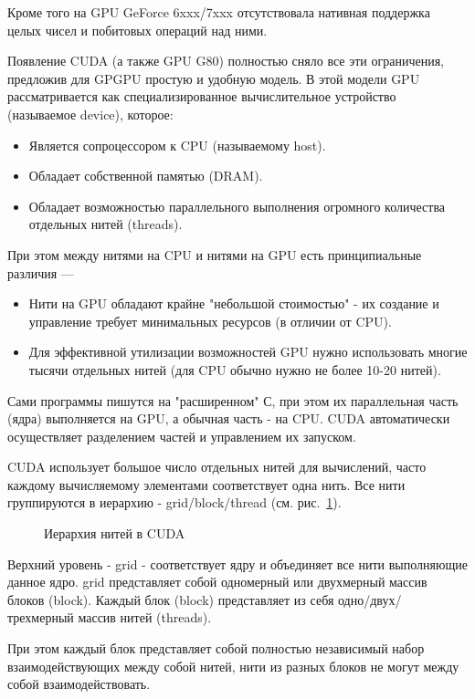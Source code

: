 Кроме того на GPU GeForce 6xxx/7xxx отсутствовала нативная поддержка целых чисел и побитовых операций над ними.

Появление CUDA (а также GPU G80) полностью сняло все эти ограничения, предложив для GPGPU простую и удобную модель. В этой модели GPU рассматривается как специализированное вычислительное устройство (называемое device), которое:
\begin{itemize}
\item Является сопроцессором к CPU (называемому host).
\item Обладает собственной памятью (DRAM).
\item Обладает возможностью параллельного выполнения огромного количества отдельных нитей (threads).
\end{itemize}

При этом между нитями на CPU и нитями на GPU есть принципиальные различия ---
\begin{itemize}
\item Нити на GPU обладают крайне "небольшой стоимостью" - их создание и управление требует минимальных ресурсов (в отличии от CPU).
\item Для эффективной утилизации возможностей GPU нужно использовать многие тысячи отдельных нитей (для CPU обычно нужно не более 10-20 нитей).
\end{itemize}

Сами программы пишутся на "расширенном" С, при этом их параллельная часть (ядра) выполняется на GPU, а обычная часть - на CPU. CUDA автоматически осуществляет разделением частей и управлением их запуском.

CUDA использует большое число отдельных нитей для вычислений, часто каждому вычисляемому элементами соответствует одна нить. Все нити группируются в иерархию - grid/block/thread (см. рис.~\ref{cuda-1}).
\begin{figure}[h]
\caption{\small{Иерархия нитей в CUDA}}
\label{cuda-1}
\end{figure}

Верхний уровень - grid - соответствует ядру и объединяет все нити выполняющие данное ядро. grid представляет собой одномерный или двухмерный массив блоков (block). Каждый блок (block) представляет из себя одно/двух/трехмерный массив нитей (threads).

При этом каждый блок представляет собой полностью независимый набор взаимодействующих между собой нитей, нити из разных блоков не могут между собой взаимодействовать.


